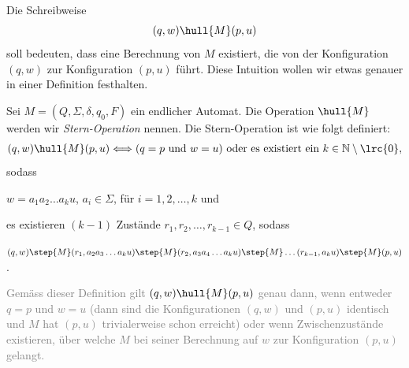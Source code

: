 Die Schreibweise
\begin{equation*}
	(q,w) \hull{M} (p,u)
\end{equation*}
soll bedeuten, dass eine Berechnung von $M$ existiert, die von der Konfiguration $(q,w)$ zur Konfiguration $(p,u)$ führt. Diese Intuition wollen wir etwas genauer in einer Definition festhalten.
\begin{mydefinition}\label{mydefinition:transitive_hull}
Sei $M = (Q,\Sigma, \delta, q_0, F)$ ein endlicher Automat. Die Operation $\hull{M}$  werden wir \textit{Stern-Operation} nennen. Die Stern-Operation ist wie folgt definiert:
\begin{align*}
	(q,w) \hull{M} (p,u) \Longleftrightarrow (q = p\text{ und } w = u)\text{ oder es existiert ein } k\in\mathbb{N}\setminus\lrc{0},
\end{align*}
sodass
\begin{renum}
	\item $w = a_1a_2\ldots a_ku$, $a_i\in\Sigma$, für $i = 1,2,\ldots ,k$ und
	\item es existieren $(k-1)$ Zustände $r_1, r_2, \ldots , r_{k-1}\in Q$, sodass

	$(q,w)\step{M}(r_1,a_2a_3\ldots a_ku)\step{M}(r_2,a_3a_4\ldots a_ku)\step{M}\ldots (r_{k-1},a_ku)\step{M} (p,u)$.
\end{renum}
\textcolor{Gray}{Gemäss dieser Definition gilt $(q,w) \hull{M} (p,u)$ genau dann, wenn entweder $q = p $ und $w = u$ (dann sind die Konfigurationen $(q,w)$ und $(p,u)$ identisch und $M$ hat $(p,u)$ trivialerweise schon erreicht) oder wenn Zwischenzustände existieren, über welche $M$ bei seiner Berechnung auf $w$ zur Konfiguration $(p,u)$ gelangt.}
\end{mydefinition}


